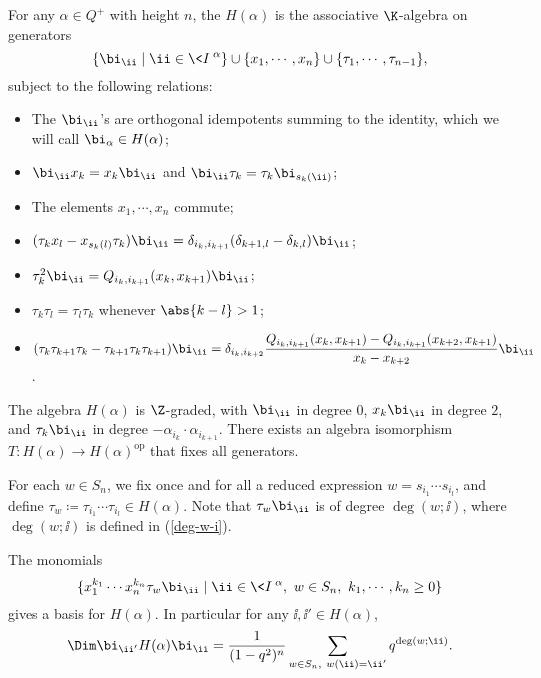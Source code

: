 \begin{definition}[{\cite[Section 2.1]{KL1}}]\label{def-of-KLR-alg}
    For any $\alpha\in Q^+$ with height $n$, the 
    $H(\alpha)$ is the associative $\K$-algebra on generators
    \[
        \{\bi_{\ii}\mid\ii\in\<I\>^\alpha\}\cup\{x_1,\cdots,x_n\}
        \cup\{\tau_1,\cdots,\tau_{n-1}\},
    \]
    subject to the following relations:
    \begin{itemize}
        \item The $\bi_{\ii}$'s are orthogonal idempotents summing to the identity,
        which we will call $\bi_\alpha\in H(\alpha)$;
        \item $\bi_{\ii} x_k = x_k \bi_{\ii}$ and $\bi_{\ii} \tau_k = \tau_k\bi_{s_k(\ii)}$;
        \item The elements $x_1,\cdots,x_n$ commute;
        \item $(\tau_k x_l-x_{s_k(l)}\tau_k)\bi_{\ii}
         = \delta_{i_k,i_{k+1}}(\delta_{k+1,l}-\delta_{k,l})\bi_{\ii}$;
        \item $\tau_k^2\bi_{\ii} = Q_{i_k,i_{k+1}}(x_k,x_{k+1})\bi_{\ii}$;
        \item $\tau_k\tau_l = \tau_l\tau_k$ whenever $\abs{k-l}>1$;
        \item $(\tau_k\tau_{k+1}\tau_k-\tau_{k+1}\tau_k\tau_{k+1})\bi_{\ii}
         = \delta_{i_k,i_{k+2}}\dfrac{Q_{i_k,i_{k+1}}(x_k,x_{k+1})
        -Q_{i_k,i_{k+1}}(x_{k+2},x_{k+1})}{x_k-x_{k+2}}\bi_{\ii}$.
    \end{itemize}
\end{definition}

The algebra $H(\alpha)$ is $\Z$-graded,
with $\bi_{\ii}$ in degree $0$, $x_k\bi_{\ii}$ in degree $2$, and $\tau_k\bi_{\ii}$
in degree $-\alpha_{i_k}\cdot\alpha_{i_{k+1}}$. There exists an algebra
isomorphism $T\colon H(\alpha)\to H(\alpha)^{\mathrm{op}}$ that fixes all generators.

For each $w\in S_n$, we fix once and for all a reduced expression $w = s_{i_1}\cdots s_{i_l}$,
and define $\tau_w\coloneq  \tau_{i_1}\cdots\tau_{i_l}\in H(\alpha)$. Note that $\tau_w\bi_{\ii}$ is of degree
$\deg(w;\ii)$, where $\deg(w;\ii)$ is defined in (\ref{deg-w-i}).

\begin{proposition}[{\cite[Theorem 2.5]{KL1}}]\label{basis-of-H}
    The monomials 
    \[
        \{x_1^{k_1}\cdots x_n^{k_n}\tau_w\bi_{\ii}\mid
        \ii\in\<I\>^\alpha,\ w\in S_n,\ k_1,\cdots,k_n\ge 0\}
    \] gives a basis
    for $H(\alpha)$. In particular for any $\ii,\ii'\in H(\alpha)$,
    \[
        \Dim \bi_{\ii'}H(\alpha)\bi_{\ii} = \dfrac1{(1-q^2)^n}
        \sum_{w\in S_n,\ w(\ii) = \ii'}q^{\deg(w;\ii)}.
    \]
\end{proposition}

